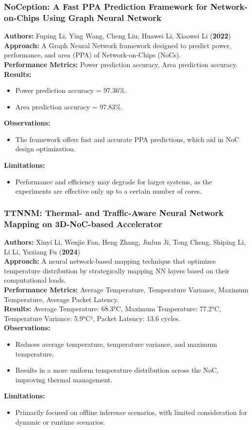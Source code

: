 \documentclass{beamer}
\begin{document}
\begin{frame}[fragile]
\frametitle{NoCeption: A Fast PPA Prediction Framework for Network-on-Chips Using Graph Neural Network}

\small
\textbf{Authors:} Fuping Li, Ying Wang, Cheng Liu, Huawei Li, Xiaowei Li (\textbf{2022}) \\
\textbf{Approach:} A Graph Neural Network framework designed to predict power, performance, and area (PPA) of Network-on-Chips (NoCs). \\
\textbf{Performance Metrics:} Power prediction accuracy, Area prediction accuracy. \\
\textbf{Results:} 
\begin{itemize}
    \item Power prediction accuracy = 97.36\%.
    \item Area prediction accuracy = 97.83\%.
\end{itemize}
\textbf{Observations:} 
\begin{itemize}
    \item The framework offers fast and accurate PPA predictions, which aid in NoC design optimization.
\end{itemize}
\textbf{Limitations:} 
\begin{itemize}
    \item Performance and efficiency may degrade for larger systems, as the experiments are effective only up to a certain number of cores.
\end{itemize}
\end{frame}

\begin{frame}[fragile]
\frametitle{TTNNM: Thermal- and Traffic-Aware Neural Network Mapping on 3D-NoC-based Accelerator}

\small
\textbf{Authors:} Xinyi Li, Wenjie Fan, Heng Zhang, Jinlun Ji, Tong Cheng, Shiping Li, Li Li, Yuxiang Fu (\textbf{2024}) \\
\textbf{Approach:} A neural network-based mapping technique that optimizes temperature distribution by strategically mapping NN layers based on their computational loads. \\
\textbf{Performance Metrics:} Average Temperature, Temperature Variance, Maximum Temperature, Average Packet Latency. \\
\textbf{Results:} Average Temperature: 68.3°C, Maximum Temperature: 77.2°C, Temperature Variance: 5.9°C², Packet Latency: 13.6 cycles. \\
\textbf{Observations:} 
\begin{itemize}
    \item Reduces average temperature, temperature variance, and maximum temperature.
    \item Results in a more uniform temperature distribution across the NoC, improving thermal management.
\end{itemize}
\textbf{Limitations:} 
\begin{itemize}
    \item Primarily focused on offline inference scenarios, with limited consideration for dynamic or runtime scenarios.
\end{itemize}
\end{frame}
\end{document}
